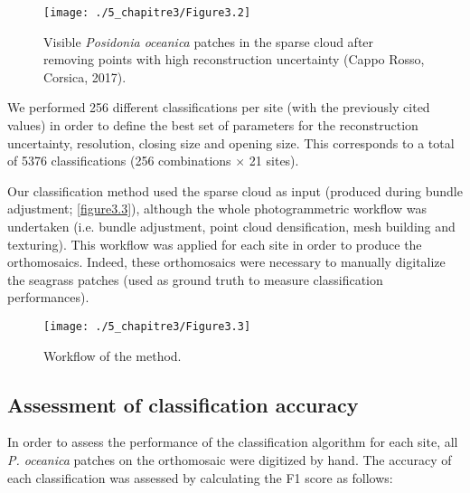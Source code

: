 \begin{figure}[H]
	\begin{center}
	\texttt{[image: ./5\_chapitre3/Figure3.2]}
		\caption[Visible \textit{Posidonia oceanica} patches in the sparse cloud after removing points with high reconstruction uncertainty.]{Visible \textit{Posidonia oceanica} patches in the sparse cloud after removing points with high reconstruction uncertainty (Cappo Rosso, Corsica, 2017).}
	\label{figure3.2}
\end{center}
\end{figure}

We performed 256 different classifications per site (with the previously cited values) in order to define the best set of parameters for the reconstruction uncertainty, resolution, closing size and opening size. This corresponds to a total of 5376 classifications (256 combinations \(\times\) 21 sites).

Our classification method used the sparse cloud as input (produced during bundle adjustment; \autoref{figure3.3}), although the whole photogrammetric workflow was undertaken (i.e. bundle adjustment, point cloud densification, mesh building and texturing). This workflow was applied for each site in order to produce the orthomosaics. Indeed, these orthomosaics were necessary to manually digitalize the seagrass patches (used as ground truth to measure classification performances).

\begin{figure}[H]
	\begin{center}
	\texttt{[image: ./5\_chapitre3/Figure3.3]}
		\caption[Workflow of the method.]{Workflow of the method.}
	\label{figure3.3}
\end{center}
\end{figure}

\subsection{Assessment of classification accuracy}
In order to assess the performance of the classification algorithm for each site, all \textit{P. oceanica} patches on the orthomosaic were digitized by hand. The accuracy of each classification was assessed by calculating the F1 score as follows:

